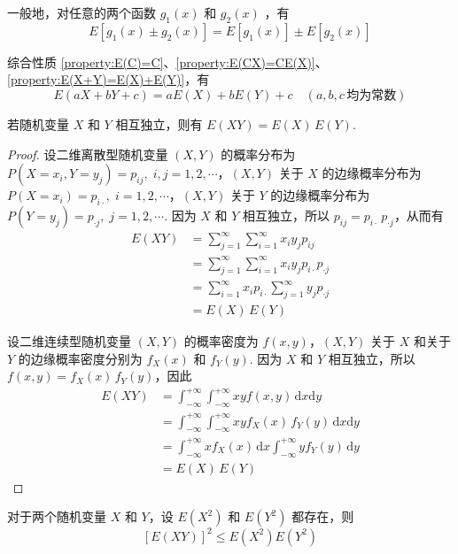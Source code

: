 一般地，对任意的两个函数 $g_1(x)$ 和 $g_2(x)$ ，有
$$
E[g_1(x) \pm g_2(x)] = E[g_1(x)] \pm E[g_2(x)]
$$

综合性质 \ref{property:E(C)=C}、\ref{property:E(CX)=CE(X)}、\ref{property:E(X+Y)=E(X)+E(Y)}，有
$$
E(aX+bY+c) = aE(X) + bE(Y) + c \quad (a,b,c \, \text{均为常数})
$$

\begin{property}[][][prop:E(XY)=E(X)E(Y)]
    \indent 若随机变量 $X$ 和 $Y$ 相互独立，则有 $E(XY)=E(X) \, E(Y)$.
\end{property}

\begin{proof}
    设二维离散型随机变量 $(X,Y)$ 的概率分布为 $P(X=x_i,Y=y_j) = p_{ij}, \; i,j=1,2,\cdots$，$(X,Y)$ 关于 $X$ 的边缘概率分布为 $P(X=x_i)=p_{i\cdot}, \; i=1,2,\cdots$，$(X,Y)$ 关于 $Y$ 的边缘概率分布为 $P(Y=y_j)=p_{\cdot j}, \; j=1,2,\cdots$. 因为 $X$ 和 $Y$ 相互独立，所以 $p_{ij} = p_{i\cdot} \, p_{\cdot j}$，从而有
    $$
    \begin{aligned}
        E(XY) &= \sum_{j=1}^{\infty} \sum_{i=1}^{\infty} x_i y_j p_{ij} \\
        &= \sum_{j=1}^{\infty} \sum_{i=1}^{\infty} x_i y_j p_{i\cdot} p_{\cdot j} \\
        &= \sum_{i=1}^{\infty} x_i p_{i\cdot} \sum_{j=1}^{\infty} y_j p_{\cdot j} \\
        &= E(X) \, E(Y)
    \end{aligned}
    $$

    设二维连续型随机变量 $(X,Y)$ 的概率密度为 $f(x,y)$，$(X,Y)$ 关于 $X$ 和关于 $Y$ 的边缘概率密度分别为 $f_X(x)$ 和 $f_Y(y)$. 因为 $X$ 和 $Y$ 相互独立，所以 $f(x,y) = f_X(x) \, f_Y(y)$，因此
    $$
    \begin{aligned}
        E(XY) &= \int_{-\infty}^{+\infty} \int_{-\infty}^{+\infty} xy f(x,y) \, \text{d}x \text{d}y \\
        &= \int_{-\infty}^{+\infty} \int_{-\infty}^{+\infty} xy f_X(x) \, f_Y(y) \, \text{d}x \text{d}y \\
        &= \int_{-\infty}^{+\infty} x f_X(x) \, \text{d}x \int_{-\infty}^{+\infty} y f_Y(y) \, \text{d}y \\
        &= E(X) \, E(Y)
    \end{aligned}
    $$
\end{proof}

\begin{property}[][柯西-施瓦茨不等式]
    \indent 对于两个随机变量 $X$ 和 $Y$，设 $E(X^2)$ 和 $E(Y^2)$ 都存在，则
    $$
    [E(XY)]^2 \leqslant E(X^2) E(Y^2)
    $$
\end{property}

